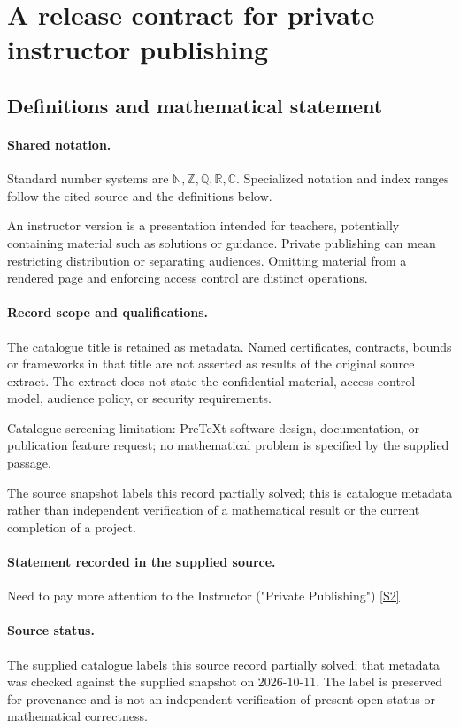 \documentclass[11pt]{article}
\newcommand{\sref}[2]{\hyperlink{source:#1:#2}{[S#2]}}
\begin{document}
\section{A release contract for private instructor publishing}\label{statement}

\subsection{Definitions and mathematical statement}

\paragraph{Shared notation.}Standard number systems are $\mathbb N,\mathbb Z,\mathbb Q,\mathbb R,\mathbb C$. Specialized notation and index ranges follow the cited source and the definitions below.


An instructor version is a presentation intended for teachers, potentially containing material such as solutions or guidance. Private publishing can mean restricting distribution or separating audiences. Omitting material from a rendered page and enforcing access control are distinct operations.
\paragraph{Record scope and qualifications.}
The catalogue title is retained as metadata. Named certificates, contracts, bounds or frameworks in that title are not asserted as results of the original source extract.
The extract does not state the confidential material, access-control model, audience policy, or security requirements.

Catalogue screening limitation: PreTeXt software design, documentation, or publication feature request; no mathematical problem is specified by the supplied passage.

The source snapshot labels this record partially solved; this is catalogue metadata rather than independent verification of a mathematical result or the current completion of a project.
\paragraph{Statement recorded in the supplied source.}
Need to pay more attention to the Instructor ("Private Publishing") \sref{statement}{2}
\paragraph{Source status.}
The supplied catalogue labels this source record partially solved; that metadata was checked against the supplied snapshot on 2026-10-11. The label is preserved for provenance and is not an independent verification of present open status or mathematical correctness.
\end{document}
